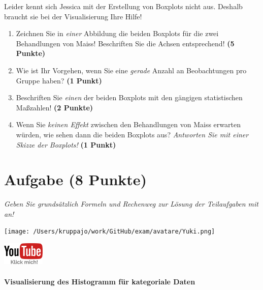 \documentclass[a4paper, 9pt]{scrartcl}\usepackage[]{graphicx}\usepackage[]{xcolor}
\begin{document}
Leider kennt sich Jessica mit der Erstellung von Boxplots nicht aus. Deshalb braucht sie bei der Visualisierung Ihre Hilfe!

\begin{enumerate}
\item Zeichnen Sie in \textit{einer} Abbildung die beiden Boxplots für die zwei Behandlungen von Maiss! Beschriften Sie die Achsen entsprechend! \textbf{(5 Punkte)} 
\item Wie ist Ihr Vorgehen, wenn Sie eine \textit{gerade} Anzahl an
  Beobachtungen pro Gruppe haben? \textbf{(1 Punkt)}
\item Beschriften Sie \textit{einen} der beiden Boxplots mit den gängigen
  statistischen Maßzahlen! \textbf{(2 Punkte)}
\item Wenn Sie \textit{keinen Effekt} zwischen den Behandlungen von
  Maiss erwarten würden, wie sehen dann die beiden Boxplots aus?
  \textit{Antworten Sie mit einer Skizze der Boxplots!}
  \textbf{(1 Punkt)}
\end{enumerate} 
\clearpage

\section{Aufgabe \hfill (8 Punkte)}

\textit{Geben Sie grundsätzlich Formeln und Rechenweg zur Lösung der Teilaufgaben mit an!} \\[1Ex]
 

 
\begin{minipage}[t]{0.5\textwidth}
\texttt{[image: /Users/kruppajo/work/GitHub/exam/avatare/Yuki.png]}
\end{minipage}
\begin{minipage}[t]{0.5\textwidth}
\hfill
\href{https://youtu.be/aXvxGC4YLqk}{\includegraphics[width = 2cm]{img/youtube}}
\end{minipage}
\vspace{-3ex}



\paragraph{Visualisierung des Histogramm für kategoriale Daten}
\end{document}

